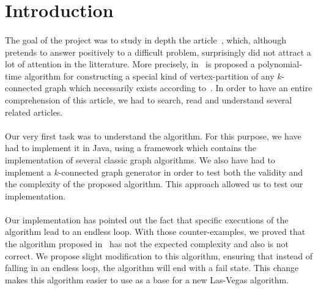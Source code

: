 \section{Introduction}
\paragraph{}
The goal of the project was to study in depth the article~\cite{JS94}, which,
although pretends to answer positively to a difficult problem,
surprisingly did not attract a lot of attention in the litterature.
More precisely, in~\cite{JS94} is proposed a polynomial-time algorithm for
constructing a special kind of vertex-partition of any $k$-connected graph
which necessarily exists according to~\cite{GE78,LL77}.
In order to have an entire comprehension of this article, we had to search,
read and understand several related articles.

\paragraph{}
Our very first task was to understand the algorithm. For this purpose, we have 
had to implement it in Java, using a framework which contains the implementation
of several classic graph algorithms.
We also have had to implement a $k$-connected graph generator in order to test both
the validity and the complexity of the proposed algorithm. This approach allowed
us to test our implementation.

\paragraph{}
Our implementation has pointed out the fact that specific executions of the
algorithm lead to an endless loop. With those counter-examples, we
proved that the algorithm proposed in~\cite{JS94} has not the expected
complexity and also is not correct.
We propose slight modification to this algorithm, ensuring that instead of
falling in an endless loop, the algorithm will end with a fail state. This
change makes this algorithm easier to use as a base for a new Las-Vegas
algorithm.
